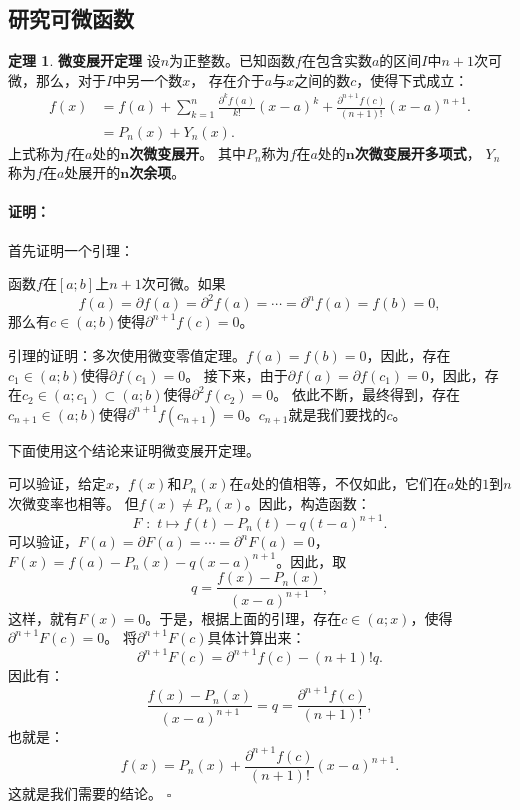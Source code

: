 \documentclass[12pt,UTF8]{ctexbook}
\theoremstyle{definition}
\newtheorem{tm}{定理}[section]
\theoremstyle{plain}
\renewenvironment{proof}{\paragraph{\textbf{证明：}}}{\hfill$\square$}
\begin{document}
\begin{appendix}
\section{研究可微函数}

\begin{tm}{\textbf{微变展开定理}}
    设$n$为正整数。已知函数$f$在包含实数$a$的区间$I$中$n+1$次可微，那么，对于$I$中另一个数$x$，
    存在介于$a$与$x$之间的数$c$，使得下式成立：
    \begin{align*}
        f(x) &= f(a) + \sum_{k=1}^n \frac{\partial^k f (a)}{k!}(x - a)^k + \frac{\partial^{n+1} f (c)}{(n+1)!}(x - a)^{n+1}.  \\
        &= P_n(x) + Y_n(x). 
    \end{align*}
    上式称为$f$在$a$处的$\boldsymbol{n}$\textbf{次微变展开}。
    其中$P_n$称为$f$在$a$处的$\boldsymbol{n}$\textbf{次微变展开多项式}，
    $Y_n$称为$f$在$a$处展开的$\boldsymbol{n}$\textbf{次余项}。
    
\end{tm}

\begin{proof}
    首先证明一个引理：

    函数$f$在$[a; b]$上$n+1$次可微。如果
    $$f(a) = \partial f(a) = \partial^2 f(a) = \cdots = \partial^{n} f(a) = f(b) = 0,$$
    那么有$c\in(a; b)$使得$\partial^{n+1} f(c) = 0$。

    引理的证明：多次使用微变零值定理。$f(a) = f(b) = 0$，因此，存在$c_1\in(a; b)$使得$\partial f (c_1) = 0$。
    接下来，由于$\partial f(a) = \partial f(c_1) = 0$，因此，存在$c_2\in(a; c_1)\subset(a; b)$使得$\partial^2 f (c_2) = 0$。
    依此不断，最终得到，存在$c_{n+1}\in(a; b)$使得$\partial^{n+1} f (c_{n+1}) = 0$。$c_{n+1}$就是我们要找的$c$。

    下面使用这个结论来证明微变展开定理。

    可以验证，给定$x$，$f(x)$和$P_n(x)$在$a$处的值相等，不仅如此，它们在$a$处的$1$到$n$次微变率也相等。
    但$f(x) \neq P_n(x)$。因此，构造函数：
    $$ F\,\,: \,\, t \mapsto f(t) - P_n(t) - q(t - a)^{n+1}. $$
    可以验证，$F(a) = \partial F(a) = \cdots = \partial^n F(a) = 0$，
    $F(x) = f(a) - P_n(x) - q(x - a)^{n+1}$。因此，取
    $$ q = \frac{f(x) - P_n(x)}{(x - a)^{n+1}}, $$
    这样，就有$F(x) = 0$。于是，根据上面的引理，存在$c\in(a; x)$，使得$\partial^{n+1} F(c) = 0$。
    将$\partial^{n+1} F(c)$具体计算出来：
    $$ \partial^{n+1} F(c) = \partial^{n+1} f(c) - (n+1)! q.$$
    因此有：
    $$ \frac{f(x) - P_n(x)}{(x - a)^{n+1}} = q = \frac{\partial^{n+1} f(c)}{(n+1)!}, $$
    也就是：
    $$ f(x) = P_n(x) + \frac{\partial^{n+1} f(c)}{(n+1)!} (x - a)^{n+1}. $$
    这就是我们需要的结论。
\end{proof}


\end{appendix}
\end{document}
